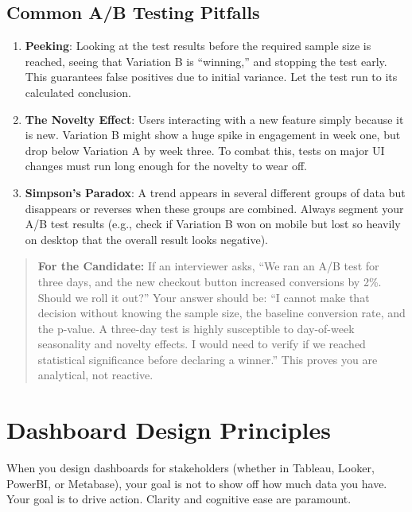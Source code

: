 \subsection{Common A/B Testing
Pitfalls}\label{common-ab-testing-pitfalls}

\begin{enumerate}
\def\labelenumi{\arabic{enumi}.}
\tightlist
\item
  \textbf{Peeking}: Looking at the test results before the required
  sample size is reached, seeing that Variation B is ``winning,'' and
  stopping the test early. This guarantees false positives due to
  initial variance. Let the test run to its calculated conclusion.
\item
  \textbf{The Novelty Effect}: Users interacting with a new feature
  simply because it is new. Variation B might show a huge spike in
  engagement in week one, but drop below Variation A by week three. To
  combat this, tests on major UI changes must run long enough for the
  novelty to wear off.
\item
  \textbf{Simpson's Paradox}: A trend appears in several different
  groups of data but disappears or reverses when these groups are
  combined. Always segment your A/B test results (e.g., check if
  Variation B won on mobile but lost so heavily on desktop that the
  overall result looks negative).
\end{enumerate}

\begin{quote}
\textbf{For the Candidate:} If an interviewer asks, ``We ran an A/B test
for three days, and the new checkout button increased conversions by
2\%. Should we roll it out?'' Your answer should be: ``I cannot make
that decision without knowing the sample size, the baseline conversion
rate, and the p-value. A three-day test is highly susceptible to
day-of-week seasonality and novelty effects. I would need to verify if
we reached statistical significance before declaring a winner.'' This
proves you are analytical, not reactive.
\end{quote}

\bigskip

\section{Dashboard Design Principles}\label{dashboard-design-principles}

When you design dashboards for stakeholders (whether in Tableau, Looker,
PowerBI, or Metabase), your goal is not to show off how much data you
have. Your goal is to drive action. Clarity and cognitive ease are
paramount.

